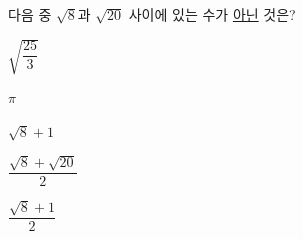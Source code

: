 다음 중 $\sqrt{8}$과 $\sqrt{20}$ 사이에 있는 수가 \underline{아닌} 것은?
\begin{choices32}{\rule[-3ex]{0pt}{8ex}$\sqrt{\dfrac{25}{3}}$}{\rule[-3ex]{0pt}{8ex}$\pi$}{\rule[-3ex]{0pt}{8ex}$\sqrt{8}+1$}{\rule[-3ex]{0pt}{8ex}$\dfrac{\sqrt{8}+\sqrt{20}}{2}$}{\rule[-3ex]{0pt}{8ex}$\dfrac{\sqrt{8}+1}{2}$}\end{choices32}
